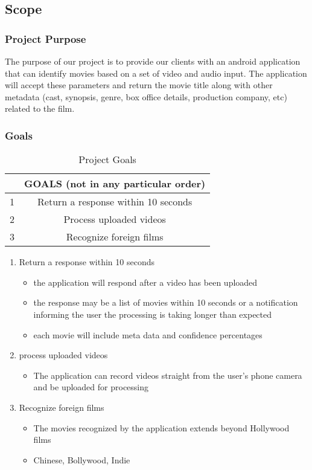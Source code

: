\documentclass[titlepage]{article}
\begin{document}
\subsection{Scope}

\subsubsection{Project Purpose}
The purpose of our project is to provide our clients with an android application that can identify movies based on a set of video and audio input. The application will accept these parameters and return the movie title along with other metadata (cast, synopsis, genre, box office details, production company, etc) related to the film. 

\subsubsection{Goals}
\begin{table}[hbtp]
    \centering
    \begin{tabular}{|c|c|}
        \hline
         & GOALS (not in any particular order)\\
         \hline
         1 & Return a response within 10 seconds\\
         \hline
         2 & Process uploaded videos\\
         \hline
         3 & Recognize foreign films\\
         \hline
    \end{tabular}
    \caption{Project Goals}
\end{table}

\begin{enumerate}
    \item Return a response within 10 seconds
    \begin{itemize}
        \item the application will respond after a video has been uploaded
        \item the response may be a list of movies within 10 seconds or a notification informing the user the processing is taking longer than expected
        \item each movie will include meta data and confidence percentages
    \end{itemize}
    
    \item process uploaded videos
    \begin{itemize}
        \item The application can record videos straight from the user's phone camera and be uploaded for processing
    \end{itemize}
    
    \item Recognize foreign films
    \begin{itemize}
        \item The movies recognized by the application extends beyond Hollywood films
        \item Chinese, Bollywood, Indie
    \end{itemize}
\end{enumerate}
\end{document}
